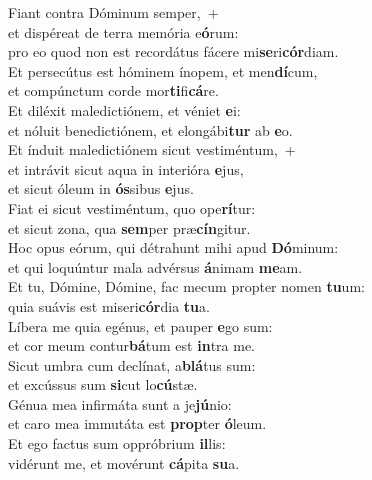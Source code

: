 \evenverse Fiant contra Dóminum semper,~+\\
\evenverse  et dispéreat de terra memória e\textbf{ó}rum:~\*\\
\evenverse pro eo quod non est recordátus fácere mi\textbf{se}ri\textbf{cór}diam.\\
\oddverse Et persecútus est hóminem ínopem, et men\textbf{dí}cum,~\*\\
\oddverse et compúnctum corde mor\textbf{ti}fi\textbf{cá}re.\\
\evenverse Et diléxit maledictiónem, et véniet \textbf{e}i:~\*\\
\evenverse et nóluit benedictiónem, et elongábi\textbf{tur} ab \textbf{e}o.\\
\oddverse Et índuit maledictiónem sicut vestiméntum,~+\\
\oddverse  et intrávit sicut aqua in interióra \textbf{e}jus,~\*\\
\oddverse et sicut óleum in \textbf{ós}sibus \textbf{e}jus.\\
\evenverse Fiat ei sicut vestiméntum, quo ope\textbf{rí}tur:~\*\\
\evenverse et sicut zona, qua \textbf{sem}per præ\textbf{cín}gitur.\\
\oddverse Hoc opus eórum, qui détrahunt mihi apud \textbf{Dó}minum:~\*\\
\oddverse et qui loquúntur mala advérsus \textbf{á}nimam \textbf{me}am.\\
\evenverse Et tu, Dómine, Dómine, fac mecum propter nomen \textbf{tu}um:~\*\\
\evenverse quia suávis est miseri\textbf{cór}dia \textbf{tu}a.\\
\oddverse Líbera me quia egénus, et pauper \textbf{e}go sum:~\*\\
\oddverse et cor meum contur\textbf{bá}tum est \textbf{in}tra me.\\
\evenverse Sicut umbra cum declínat, a\textbf{blá}tus sum:~\*\\
\evenverse et excússus sum \textbf{si}cut lo\textbf{cú}stæ.\\
\oddverse Génua mea infirmáta sunt a je\textbf{jú}nio:~\*\\
\oddverse et caro mea immutáta est \textbf{prop}ter \textbf{ó}leum.\\
\evenverse Et ego factus sum oppróbrium \textbf{il}lis:~\*\\
\evenverse vidérunt me, et movérunt \textbf{cá}pita \textbf{su}a.\\
